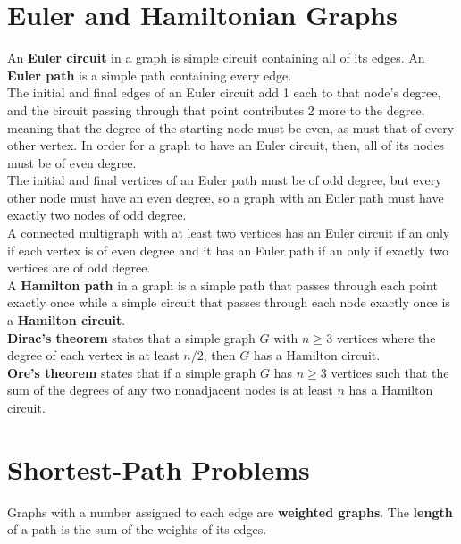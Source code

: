 \documentclass[./Discrete Math.tex]{subfiles}
\begin{document}
	\section{Euler and Hamiltonian Graphs}
		An \textbf{Euler circuit} in a graph is simple circuit containing all of its edges. An \textbf{Euler path} is a simple path containing every edge. \\
		The initial and final edges of an Euler circuit add 1 each to that node's degree, and the circuit passing through that point contributes 2 more to the degree, meaning that the degree of the starting node must be even, as must that of every other vertex. In order for a graph to have an Euler circuit, then, all of its nodes must be of even degree. \\
		The initial and final vertices of an Euler path must be of odd degree, but every other node must have an even degree, so a graph with an Euler path must have exactly two nodes of odd degree. \\
		A connected multigraph with at least two vertices has an Euler circuit if an only if each vertex is of even degree and it has an Euler path if an only if exactly two vertices are of odd degree. \\
		A \textbf{Hamilton path} in a graph is a simple path that passes through each point exactly once while a simple circuit that passes through each node exactly once is a \textbf{Hamilton circuit}. \\
		\textbf{Dirac's theorem} states that a simple graph \(G\) with \(n \ge 3\) vertices where the degree of each vertex is at least \(n / 2\), then \(G\) has a Hamilton circuit. \\
		\textbf{Ore's theorem} states that if a simple graph \(G\) has \(n \ge 3\) vertices such that the sum of the degrees of any two nonadjacent nodes is at least \(n\) has a Hamilton circuit.
	\section{Shortest-Path Problems}
		Graphs with a number assigned to each edge are \textbf{weighted graphs}. The \textbf{length} of a path is the sum of the weights of its edges.
\end{document}
